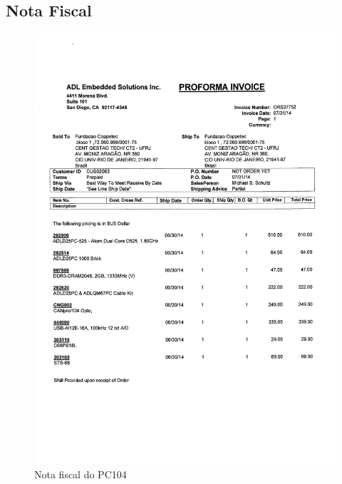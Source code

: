 \subsection{Nota Fiscal}
\begin{figure}[H]
 \centering
 \includegraphics[width=0.9\columnwidth]{PC104/nota_adl.pdf}
 \caption{Nota fiscal do PC104}
\end{figure}


